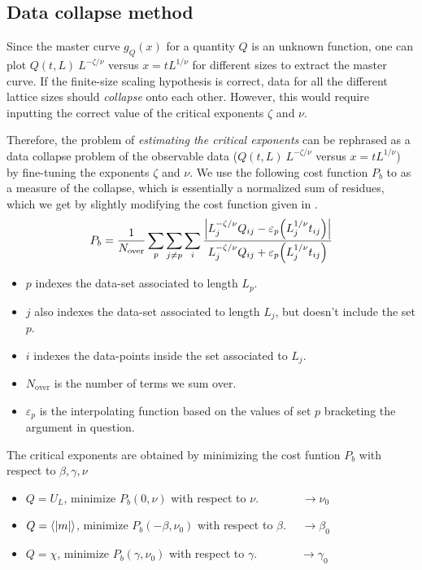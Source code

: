 \documentclass[../thesis_main.tex]{subfiles}
\begin{document}
\subsection{Data collapse method}
Since the master curve $g_Q(x)$ for a quantity $Q$ is an unknown function, one can plot $Q(t, L) \:L^{-\zeta/\nu}$ versus $x = tL^{1/\nu}$ for different sizes to extract the master curve. If the finite-size scaling hypothesis is correct, data for all the different lattice sizes should \textit{collapse} onto each other. However, this would require inputting the correct value of the critical exponents $\zeta$ and $\nu$.

Therefore, the problem of \textit{estimating the critical exponents} can be rephrased as a data collapse problem of the observable data ($Q(t, L) \:L^{-\zeta/\nu}$ versus $x = tL^{1/\nu}$) by fine-tuning the exponents $\zeta$ and $\nu$. We use the following cost function $P_b$ to as a measure of the collapse, which is essentially a normalized sum of residues, which we get by slightly modifying the cost function given in \cite{Bhattacharjee_2001}.
\begin{equation}
    P_b = \frac{1}{N_\text{over}} \sum_p \sum_{j \neq p} \sum_i \frac{\qty|L_j^{-\zeta/\nu}Q_{ij} - \varepsilon_p\qty(L_j^{1/\nu} t_{ij})|}{L_j^{-\zeta/\nu}Q_{ij} + \varepsilon_p\qty(L_j^{1/\nu} t_{ij})}
\end{equation}    
\begin{itemize}[label={\textbf{--}}]
    \setlength{\itemsep}{0.1em}
    \item $p$ indexes the data-set associated to length $L_p$. 
    \item $j$ also indexes the data-set associated to length $L_j$, but doesn't include the set $p$.      
    \item $i$ indexes the data-points inside the set associated to $L_j$.
    \item $N_\text{over}$ is the number of terms we sum over. 
    \item $\varepsilon_p$ is the interpolating function based on the values of set $p$ bracketing the argument in question. 
\end{itemize} 
The critical exponents are obtained by minimizing the cost funtion $P_b$ with respect to $\beta, \gamma, \nu$
\begin{itemize}[label={\textbf{--}}]
    \setlength{\itemsep}{0.1em}
    \item $Q = U_L$, minimize $P_b(0, \nu)$ with respect to $\nu$. $\:\:\quad\quad\quad\longrightarrow \nu_0$
    \item $Q = \expval{|m|}$, minimize $P_b(-\beta, \nu_0)$ with respect to $\beta$. $\quad\longrightarrow \beta_0$
    \item $Q = \chi$, minimize $P_b(\gamma, \nu_0)$ with respect to $\gamma$. $\:\:\quad\quad\quad\longrightarrow \gamma_0$   
\end{itemize}
\end{document}

